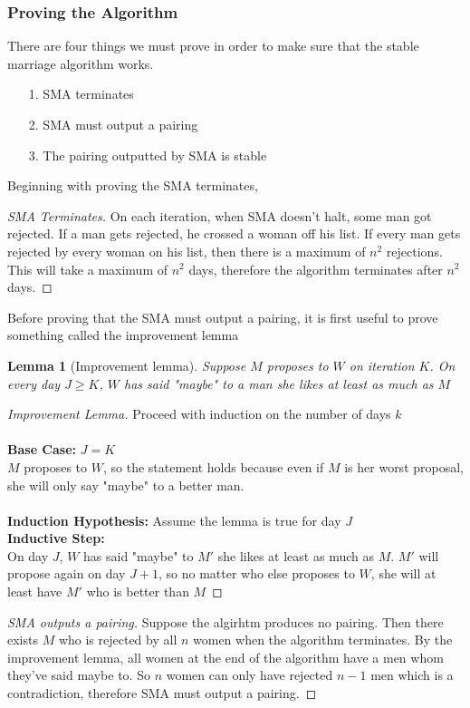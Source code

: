 \documentclass{article}
\newtheorem{proof}{Proof}
\newtheorem{lemma}{Lemma}
\begin{document}
\subsubsection{Proving the Algorithm}
There are four things we must prove in order to make sure that the stable marriage algorithm works.
\begin{itemize}
    \item[1. ] SMA terminates
    \item[2. ] SMA must output a pairing
    \item[3. ] The pairing outputted by SMA is stable
\end{itemize}
Beginning with proving the SMA terminates,
\begin{proof}[SMA Terminates]
    On each iteration, when SMA doesn't halt, some man got rejected. If a man gets 
    rejected, he crossed a woman off his list. If every man gets rejected by every woman on his list, then
    there is a maximum of $n^2$ rejections. This will take a maximum of $n^2$ days, therefore the algorithm
    terminates after $n^2$ days.
\end{proof}
Before proving that the SMA must output a pairing, it is first useful to prove something called the improvement lemma
\begin{lemma}[Improvement lemma]
    Suppose $M$ proposes to $W$ on iteration $K$. On every day $J \ge K$,
    $W$ has said "maybe" to a man she likes at least as much as $M$ 
\end{lemma}
\begin{proof}[Improvement Lemma]
    Proceed with induction on the number of days $k$\\\\
    \textbf{Base Case: }$J = K$\\
    $M$ proposes to $W$, so the statement holds because even if $M$ is her worst proposal,
    she will only say "maybe" to a better man.\\\\
    \textbf{Induction Hypothesis: } Assume the lemma is true for day $J$\\
    \textbf{Inductive Step: }\\
    On day $J$, $W$ has said "maybe" to $M'$ she likes at least as much as $M$. $M'$ will propose again on
    day $J+1$, so no matter who else proposes to $W$, she will at least have $M'$ who is better than $M$
\end{proof}
\begin{proof}[SMA outputs a pairing]
    Suppose the algirhtm produces no pairing. Then there exists $M$ who is rejected by all $n$ women
    when the algorithm terminates. By the improvement lemma, all women at the end of the algorithm have a men
    whom they've said maybe to. So $n$ women can only have rejected $n-1$ men which is a contradiction, therefore
    SMA must output a pairing.
\end{proof}
\end{document}
